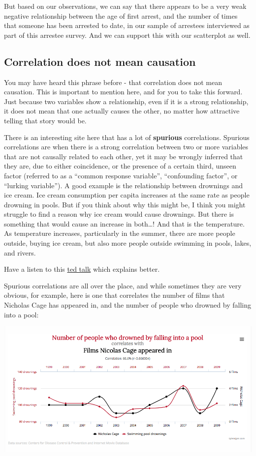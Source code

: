 \documentclass[]{book}
\theoremstyle{definition}
\theoremstyle{definition}
\theoremstyle{definition}
\theoremstyle{remark}
\begin{document}
But based on our observations, we can say that there appears to be a
very weak negative relationship between the age of first arrest, and the
number of times that someone has been arrested to date, in our sample of
arrestees interviewed as part of this arrestee survey. And we can
support this with our scatterplot as well.

\hypertarget{correlation-does-not-mean-causation}{%
\subsection{Correlation does not mean
causation}\label{correlation-does-not-mean-causation}}

You may have heard this phrase before - that correlation does not mean
causation. This is important to mention here, and for you to take this
forward. Just because two variables show a relationship, even if it is a
strong relationship, it does not mean that one actually causes the
other, no matter how attractive telling that story would be.

There is an interesting site here that has a lot of \textbf{spurious}
correlations. Spurious correlations are when there is a strong
correlation between two or more variables that are not causally related
to each other, yet it may be wrongly inferred that they are, due to
either coincidence, or the presence of a certain third, unseen factor
(referred to as a ``common response variable'', ``confounding factor'',
or ``lurking variable''). A good example is the relationship between
drownings and ice cream. Ice cream consumption per capita increases at
the same rate as people drowning in pools. But if you think about why
this might be, I think you might struggle to find a reason why ice cream
would cause drownings. But there is something that would cause an
increase in both\ldots{}! And that is the temperature. As temperature
increases, particularly in the summer, there are more people outside,
buying ice cream, but also more people outside swimming in pools, lakes,
and rivers.

Have a listen to this
\href{https://www.youtube.com/watch?v=8B271L3NtAw}{ted talk} which
explains better.

Spurious correlations are all over the place, and while sometimes they
are very obvious, for example, here is one that correlates the number of
films that Nicholas Cage has appeared in, and the number of people who
drowned by falling into a pool:

\includegraphics{imgs/supr_corr.png}
\end{document}
